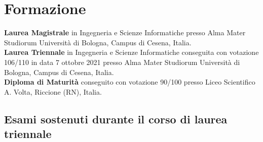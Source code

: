\documentclass[curriculum-vitae-ita]{subfiles}
\begin{document}
	\section*{Formazione}
		 \textbf{Laurea Magistrale} in Ingegneria e Scienze Informatiche presso Alma Mater Studiorum Università di Bologna, Campus di Cesena, Italia.\\
		
		 \textbf{Laurea Triennale} in Ingegneria e Scienze Informatiche conseguita con votazione 106/110 in data 7 ottobre 2021 presso Alma Mater Studiorum Università di Bologna, Campus di Cesena, Italia.\\

		 \textbf{Diploma di Maturità} conseguito con votazione 90/100 presso Liceo Scientifico A. Volta, Riccione (RN), Italia.
		
		\subsection*{Esami sostenuti durante il corso di laurea triennale}
			\begin{minipage}[t]{.47\textwidth}
			\end{minipage}
			\hfill
			\begin{minipage}[t]{.47\textwidth}
			\end{minipage}
		
\end{document}
